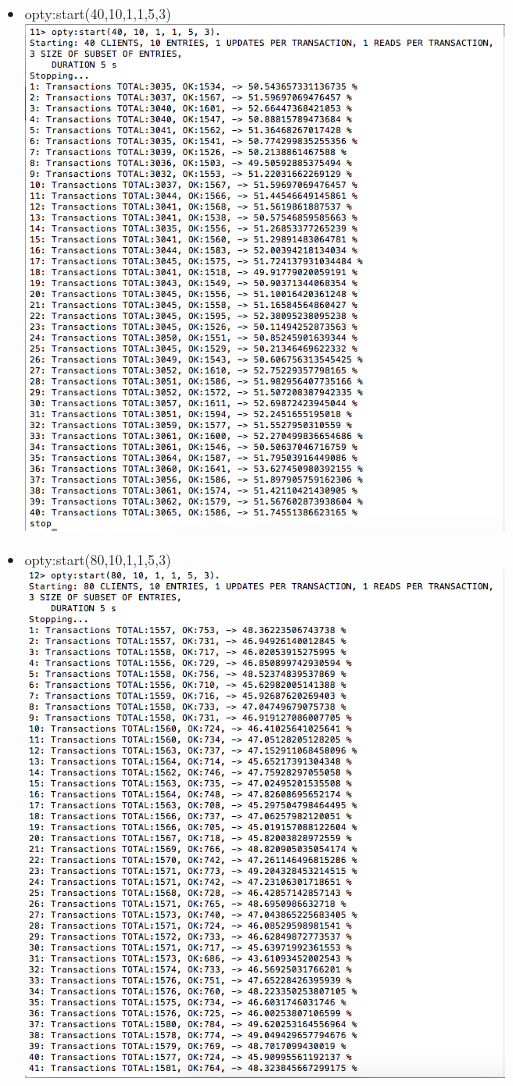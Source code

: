 \documentclass[a4paper, 11pt]{article}
\begin{document}
\begin{itemize}
\item opty:start(40,10,1,1,5,3)\\
\includegraphics[scale=0.5]{images/exp-i-5.png} \\
\item opty:start(80,10,1,1,5,3)\\
\includegraphics[scale=0.4]{images/exp-i-6a.png} \\

\end{itemize}
\end{document}
